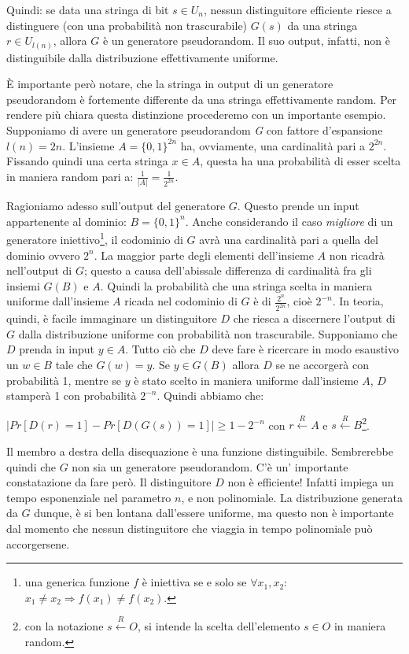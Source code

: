 \documentclass[a4paper,openright,twoside,12pt]{report}
\begin{document}
Quindi: se data una stringa di bit $s \in U_{n}$, nessun distinguitore efficiente riesce a distinguere (con una probabilit\`a non trascurabile) $G(s)$ da una stringa $r \in U_{l(n)}$, allora 
$G$ \`e un generatore pseudorandom. Il suo output, infatti, non \`e distinguibile dalla distribuzione effettivamente uniforme.

\`E importante per\`o notare, che la stringa in output di un generatore pseudorandom \`e fortemente differente da una stringa effettivamente random. Per rendere pi\`u chiara questa distinzione procederemo
con un importante esempio.
Supponiamo di avere un generatore pseudorandom \emph{G} con fattore d'espansione $l(n)=2n$.
L'insieme $A=\{0, 1\}^{2n}$ ha, ovviamente, una cardinalit\`a pari a $2^{2n}$. Fissando quindi una certa stringa $x \in A$, 
questa ha una probabilit\`a di esser scelta in maniera random pari a: $\frac{1}{\lvert A \rvert} = \frac{1}{2^{2n}}$.

Ragioniamo adesso sull'output del generatore $G$. Questo prende un input appartenente al dominio: $B=\{0, 1\}^{n}$. 
Anche considerando il caso \emph{migliore} di un generatore iniettivo\footnote{una generica funzione $f$ \`e iniettiva se e solo se $\forall x_1, x_2:$ $x_1 \neq x_2 \Rightarrow f(x_1) \neq f(x_2)$.},
il codominio di $G$ avr\`a una cardinalit\`a pari a quella del dominio ovvero $2^{n}$. La maggior parte degli elementi dell'insieme $A$ non ricadr\`a 
nell'output di $G$; questo a causa dell'abissale differenza di cardinalit\`a fra gli insiemi $G(B)$ e $A$.
Quindi la probabilit\`a che una stringa scelta in maniera uniforme dall'insieme $A$ ricada nel codominio di $G$ \`e di $\frac{2^{n}}{2^{2n}}$, cio\`e $2^{-n}$.
In teoria, quindi, \`e facile immaginare un distinguitore $D$ che riesca a discernere l'output di $G$ dalla distribuzione uniforme con probabilit\`a non trascurabile.
Supponiamo che $D$ prenda in input $y \in A$. Tutto ci\`o che $D$ deve fare \`e ricercare in modo esaustivo un $w \in B$ tale che $G(w) = y$.
Se $y \in G(B)$ allora $D$ se ne accorger\`a con probabilit\`a 1, mentre se $y$ \`e stato scelto in maniera uniforme dall'insieme $A$, $D$ stamper\`a 1 con probabilit\`a $2^{-n}$. 
\newpage Quindi abbiamo che:
\begin{center}
$\lvert Pr[D(r)=1] - Pr[D(G(s))=1]\rvert \geq 1 - 2^{-n}$ con $r \xleftarrow{R} A$ e $s \xleftarrow{R} B$\footnote{con la notazione $s \xleftarrow{R} O$, si intende la scelta dell'elemento 
$s \in O$ in maniera random.}.
\end{center} 
Il membro a destra della disequazione \`e una funzione distinguibile. Sembrerebbe quindi che $G$ non sia un generatore pseudorandom.
C'\`e un' importante constatazione da fare per\`o. Il distinguitore $D$ non \`e efficiente! Infatti impiega un tempo esponenziale nel parametro $n$, e non polinomiale.
La distribuzione generata da $G$ dunque, \`e si ben lontana dall'essere uniforme, ma questo non \`e importante dal momento che nessun distinguitore che viaggia in tempo polinomiale pu\`o 
accorgersene.
\end{document}
